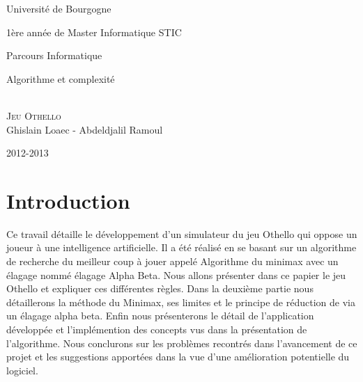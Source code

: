 \documentclass[11pt]{article}
\begin{document}
\begin{titlepage}
\begin{center}

{\Large 
    Université de Bourgogne
    
    1ère année de Master Informatique STIC
    
    Parcours Informatique
    
    Algorithme et complexité
}
\\[1.5cm]
  \textsc{\Huge Jeu Othello}
\\[1.5cm]  
  Ghislain Loaec - Abdeldjalil Ramoul
  
  2012-2013
\end{center}

\begin{abstract}
  Ce rapport présente le travaille effectué dans le cadre du projet
  d'algorithme et complexité :
  \\
  \\
  Programmer le jeu Othello, aussi appelé Reversi. L’utilisateur doit pouvoir jouer contre l’ordinateur ; Programmer un minimax avec élagage alpha-beta. Le principe est donné dans wikipedia. Un module implantant le minimax est fourni dans [CMP00, CMP98], disponible librement sur internet (ou à la BU).
Si vous êtes au moins 2 étudiants sur ce projet, soignez l’interface graphique.
\end{abstract}


\end{titlepage}

{\tableofcontents}

{\listoffigures}

{\listoftables}

{\listofalgorithms}

\section{Introduction}

Ce travail détaille le développement d'un simulateur du jeu Othello
qui oppose un joueur à une intelligence artificielle. Il a été
réalisé en se basant sur un algorithme de recherche du meilleur coup
à jouer appelé Algorithme du minimax avec un élagage nommé
élagage Alpha Beta. Nous allons présenter dans ce papier le jeu
Othello et expliquer ces différentes règles. Dans la deuxième
partie nous détaillerons la méthode du Minimax, ses limites et le
principe de réduction de via un élagage alpha beta. Enfin nous
présenterons le détail de l'application développée et
l'implémention des concepts vus dans la présentation de l'algorithme.
Nous conclurons sur les problèmes recontrés dans l'avancement de ce
projet et les suggestions apportées dans la vue d'une amélioration
potentielle du logiciel.
\end{document}
